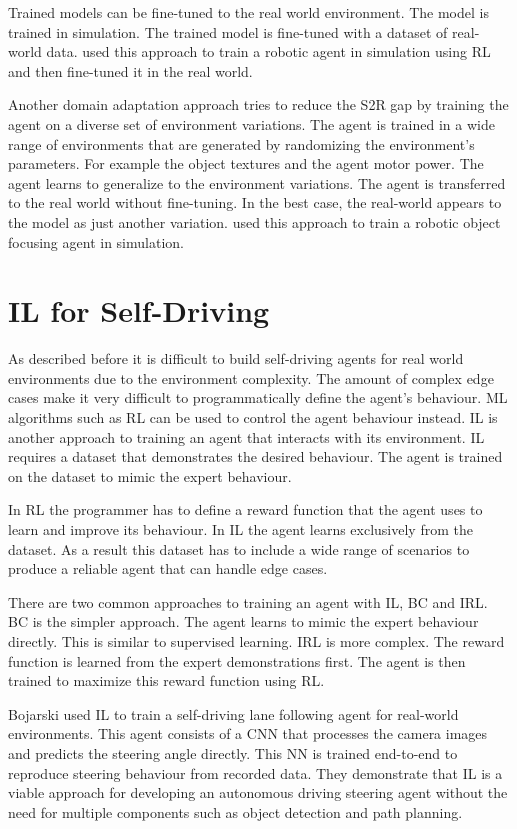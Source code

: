 Trained models can be fine-tuned to the real world environment. The model is trained in simulation. The trained model is fine-tuned with a dataset of real-world data. \textcite{sim2RealGap_rl} used this approach to train a robotic agent in simulation using \ac{RL} and then fine-tuned it in the real world. 

Another domain adaptation approach tries to reduce the \ac{S2R} gap by training the agent on a diverse set of environment variations. The agent is trained in a wide range of environments that are generated by randomizing the environment's parameters. For example the object textures and the agent motor power. The agent learns to generalize to the environment variations. The agent is transferred to the real world without fine-tuning. In the best case, the real-world appears to the model as just another variation. \textcite{sim2RealGap_vision} used this approach to train a robotic object focusing agent in simulation.


\section{\acl{IL} for Self-Driving}
As described before it is difficult to build self-driving agents for real world environments due to the environment complexity. The amount of complex edge cases make it very difficult to programmatically define the agent's behaviour. \ac{ML} algorithms such as \ac{RL} can be used to control the agent behaviour instead. 
\ac{IL} is another approach to training an agent that interacts with its environment. \ac{IL} requires a dataset that demonstrates the desired behaviour. The agent is trained on the dataset to mimic the expert behaviour.

In \ac{RL} the programmer has to define a reward function that the agent uses to learn and improve its behaviour. In \ac{IL} the agent learns exclusively from the dataset. As a result this dataset has to include a wide range of scenarios to produce a reliable agent that can handle edge cases.

There are two common approaches to training an agent with \ac{IL}, \ac{BC} and \ac{IRL}. \ac{BC} is the simpler approach. The agent learns to mimic the expert behaviour directly. This is similar to supervised learning. \ac{IRL} is more complex. The reward function is learned from the expert demonstrations first. The agent is then trained to maximize this reward function using \ac{RL}.

Bojarski \textcite{bojarski2016endToEnd} used \ac{IL} to train a self-driving lane following agent for real-world environments. This agent consists of a \ac{CNN} that processes the camera images and predicts the steering angle directly. This \ac{NN} is trained end-to-end to reproduce steering behaviour from recorded data. They demonstrate that \ac{IL} is a viable approach for developing an autonomous driving steering agent without the need for multiple components such as object detection and path planning.

